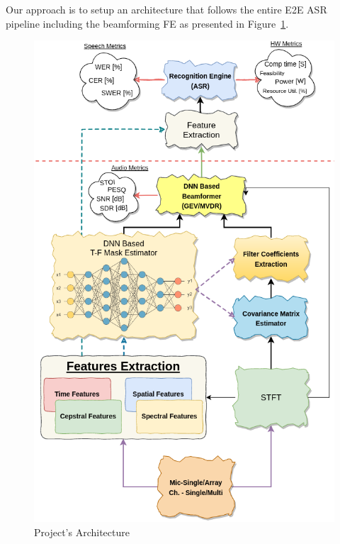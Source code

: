 Our approach is to setup an architecture 
that follows the entire E2E ASR pipeline including
the beamforming FE as presented in
Figure~\ref{fig:proj_blocks}.
\begin{figure}[H]
	\vspace{-2.65cm}
	\centering
	\includegraphics[width=\textwidth]
	{Introduction/images/proj_blocks2}
	\caption{Project's Architecture}\label{fig:proj_blocks}
\end{figure}



